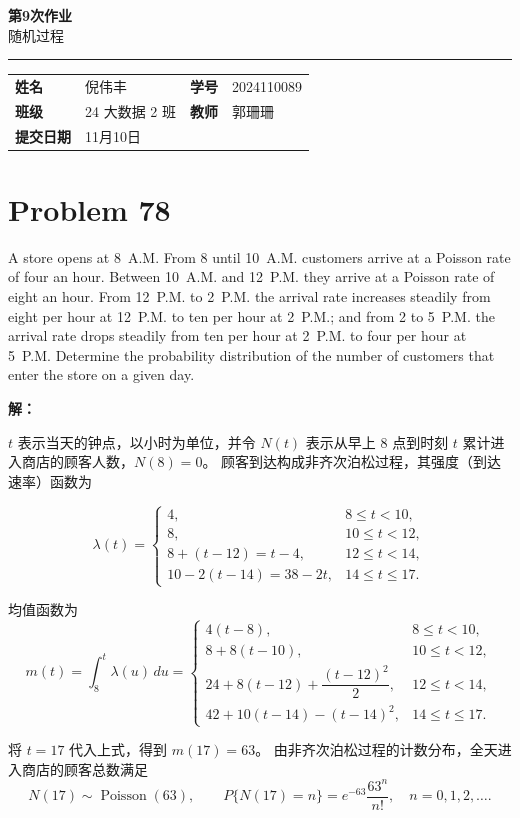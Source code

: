 \documentclass[12pt,a4paper]{article}
\newcommand{\course}{随机过程}
\newcommand{\homeworktitle}{第9次作业}
\newcommand{\studentname}{倪伟丰}
\newcommand{\studentid}{2024110089}
\newcommand{\classname}{24 大数据 2 班}
\newcommand{\teacher}{郭珊珊}
\begin{document}
\begin{center}
  {\Huge\bfseries\color{mainblue}\homeworktitle}\\[0.6em]
  {\Large\course}\\[1.2em]
  {\color{linegray}\rule{0.9\textwidth}{0.8pt}}
\end{center}

\begin{infobox}
\begin{tabularx}{\linewidth}{>{\bfseries}p{2.2cm} X >{\bfseries}p{2.2cm} X}
姓名 & \studentname & 学号 & \studentid \\
班级 & \classname & 教师 & \teacher \\
提交日期 & 11月10日 &  &  \\
\end{tabularx}
\end{infobox}



\section{Problem 78}

A store opens at 8~A.M. From 8 until 10~A.M. customers arrive at a Poisson
rate of four an hour. Between 10~A.M. and 12~P.M. they arrive at a Poisson
rate of eight an hour. From 12~P.M. to 2~P.M. the arrival rate increases
steadily from eight per hour at 12~P.M. to ten per hour at 2~P.M.;
and from 2 to 5~P.M. the arrival rate drops steadily from ten per hour
at 2~P.M. to four per hour at 5~P.M. Determine the probability distribution
of the number of customers that enter the store on a given day.

\begin{answerbox}
\textbf{解：}

$t$ 表示当天的钟点，以小时为单位，并令 $N(t)$ 表示从早上
8 点到时刻 $t$ 累计进入商店的顾客人数，$N(8)=0$。
顾客到达构成非齐次泊松过程，其强度（到达速率）函数为

$$
\lambda(t)=
\begin{cases}
4, & 8\le t<10,\\
8, & 10\le t<12,\\
8+(t-12)=t-4, & 12\le t<14,\\
10-2(t-14)=38-2t, & 14\le t\le17.
\end{cases}
$$

均值函数为
$$
m(t)=\int_8^t\lambda(u)\,du
=\begin{cases}
4(t-8), & 8\le t<10,\\[2pt]
8+8(t-10), & 10\le t<12,\\[2pt]
24+8(t-12)+\dfrac{(t-12)^2}{2}, & 12\le t<14,\\[6pt]
42+10(t-14)-(t-14)^2, & 14\le t\le17.
\end{cases}
$$

将 $t=17$ 代入上式，得到 $m(17)=63$。
由非齐次泊松过程的计数分布，全天进入商店的顾客总数满足
$$
N(17)\sim\operatorname{Poisson}(63),
\qquad
P\{N(17)=n\}=e^{-63}\frac{63^n}{n!},\quad n=0,1,2,\ldots.
$$

\end{answerbox}
\end{document}
